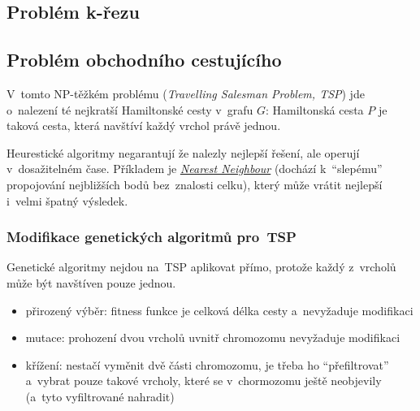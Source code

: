 \subsection{Problém k-řezu}


\subsection{Problém obchodního cestujícího}

V~tomto NP-těžkém problému (\emph{Travelling Salesman Problem, TSP}) jde o~nalezení té nejkratší Hamiltonské cesty v~grafu $G$:
Hamiltonská cesta $P$ je taková cesta, která navštíví každý vrchol právě jednou.

Heurestické algoritmy negarantují že nalezly nejlepší řešení, ale operují v~dosažitelném čase.
Příkladem je \href{https://en.wikipedia.org/wiki/Nearest_neighbour_algorithm}{\emph{Nearest Neighbour}} (dochází k~\enquote{slepému} propojování nejbližších bodů bez~znalosti celku), který může vrátit nejlepší i~velmi špatný výsledek.

\subsubsection{Modifikace genetických algoritmů pro~TSP}

Genetické algoritmy nejdou na~TSP aplikovat přímo, protože každý z~vrcholů může být navštíven pouze jednou.

\begin{itemize}
\item přirozený výběr: fitness funkce je celková délka cesty a~nevyžaduje modifikaci
\item mutace: prohození dvou vrcholů uvnitř chromozomu nevyžaduje modifikaci
\item křížení: nestačí vyměnit dvě části chromozomu, je třeba ho \enquote{přefiltrovat} a~vybrat pouze takové vrcholy, které se v~chormozomu ještě neobjevily (a~tyto vyfiltrované nahradit)
\end{itemize}

% 
% 
% 

